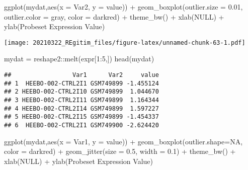 \documentclass[
]{book}
\newenvironment{Shaded}{\begin{snugshade}}{\end{snugshade}}
\newcommand{\AttributeTok}[1]{\textcolor[rgb]{0.77,0.63,0.00}{#1}}
\newcommand{\ConstantTok}[1]{\textcolor[rgb]{0.00,0.00,0.00}{#1}}
\newcommand{\DecValTok}[1]{\textcolor[rgb]{0.00,0.00,0.81}{#1}}
\newcommand{\FloatTok}[1]{\textcolor[rgb]{0.00,0.00,0.81}{#1}}
\newcommand{\FunctionTok}[1]{\textcolor[rgb]{0.00,0.00,0.00}{#1}}
\newcommand{\NormalTok}[1]{#1}
\newcommand{\OtherTok}[1]{\textcolor[rgb]{0.56,0.35,0.01}{#1}}
\newcommand{\SpecialCharTok}[1]{\textcolor[rgb]{0.00,0.00,0.00}{#1}}
\newcommand{\StringTok}[1]{\textcolor[rgb]{0.31,0.60,0.02}{#1}}
\begin{document}
\begin{Shaded}
\begin{Highlighting}[]
\FunctionTok{ggplot}\NormalTok{(mydat,}\FunctionTok{aes}\NormalTok{(}\AttributeTok{x =}\NormalTok{ Var2, }\AttributeTok{y =}\NormalTok{ value)) }\SpecialCharTok{+}
  \FunctionTok{geom\_boxplot}\NormalTok{(}\AttributeTok{outlier.size =} \FloatTok{0.01}\NormalTok{, }\AttributeTok{outlier.color =} \StringTok{\textquotesingle{}gray\textquotesingle{}}\NormalTok{, }\AttributeTok{color =} \StringTok{\textquotesingle{}darkred\textquotesingle{}}\NormalTok{) }\SpecialCharTok{+}
  \FunctionTok{theme\_bw}\NormalTok{() }\SpecialCharTok{+}
  \FunctionTok{xlab}\NormalTok{(}\ConstantTok{NULL}\NormalTok{) }\SpecialCharTok{+} \FunctionTok{ylab}\NormalTok{(}\StringTok{\textquotesingle{}Probeset Expression Value\textquotesingle{}}\NormalTok{)}
\end{Highlighting}
\end{Shaded}

\texttt{[image: 20210322\_REgitim\_files/figure-latex/unnamed-chunk-63-1.pdf]}

\begin{Shaded}
\begin{Highlighting}[]
\NormalTok{mydat }\OtherTok{=}\NormalTok{ reshape2}\SpecialCharTok{::}\FunctionTok{melt}\NormalTok{(expr[}\DecValTok{1}\SpecialCharTok{:}\DecValTok{5}\NormalTok{,])}
\FunctionTok{head}\NormalTok{(mydat)}
\end{Highlighting}
\end{Shaded}

\begin{verbatim}
##                 Var1      Var2     value
## 1  HEEBO-002-CTRL2I1 GSM749899 -1.455124
## 2 HEEBO-002-CTRL2I10 GSM749899  1.044670
## 3 HEEBO-002-CTRL2I11 GSM749899  1.164344
## 4 HEEBO-002-CTRL2I14 GSM749899  1.597227
## 5 HEEBO-002-CTRL2I15 GSM749899 -1.454337
## 6  HEEBO-002-CTRL2I1 GSM749900 -2.624420
\end{verbatim}

\begin{Shaded}
\begin{Highlighting}[]
\FunctionTok{ggplot}\NormalTok{(mydat,}\FunctionTok{aes}\NormalTok{(}\AttributeTok{x =}\NormalTok{ Var1, }\AttributeTok{y =}\NormalTok{ value)) }\SpecialCharTok{+}
  \FunctionTok{geom\_boxplot}\NormalTok{(}\AttributeTok{outlier.shape=}\ConstantTok{NA}\NormalTok{, }\AttributeTok{color =} \StringTok{\textquotesingle{}darkred\textquotesingle{}}\NormalTok{) }\SpecialCharTok{+}
  \FunctionTok{geom\_jitter}\NormalTok{(}\AttributeTok{size =} \FloatTok{0.5}\NormalTok{, }\AttributeTok{width =} \FloatTok{0.1}\NormalTok{) }\SpecialCharTok{+}
  \FunctionTok{theme\_bw}\NormalTok{() }\SpecialCharTok{+}
  \FunctionTok{xlab}\NormalTok{(}\ConstantTok{NULL}\NormalTok{) }\SpecialCharTok{+} \FunctionTok{ylab}\NormalTok{(}\StringTok{\textquotesingle{}Probeset Expression Value\textquotesingle{}}\NormalTok{)}
\end{Highlighting}
\end{Shaded}
\end{document}
